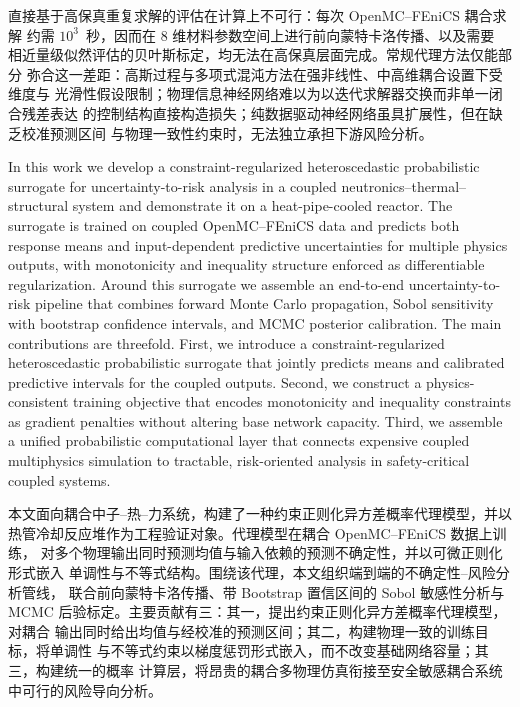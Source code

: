 \documentclass[11pt,a4paper]{article}
\begin{document}
直接基于高保真重复求解的评估在计算上不可行：每次 OpenMC--FEniCS 耦合求解
约需 $10^{3}$~秒，因而在 8 维材料参数空间上进行前向蒙特卡洛传播、以及需要
相近量级似然评估的贝叶斯标定，均无法在高保真层面完成。常规代理方法仅能部分
弥合这一差距：高斯过程与多项式混沌方法在强非线性、中高维耦合设置下受维度与
光滑性假设限制；物理信息神经网络难以为以迭代求解器交换而非单一闭合残差表达
的控制结构直接构造损失；纯数据驱动神经网络虽具扩展性，但在缺乏校准预测区间
与物理一致性约束时，无法独立承担下游风险分析。

In this work we develop a constraint-regularized heteroscedastic probabilistic
surrogate for uncertainty-to-risk analysis in a coupled
neutronics--thermal--structural system and demonstrate it on a
heat-pipe-cooled reactor. The surrogate is trained on coupled OpenMC--FEniCS
data and predicts both response means and input-dependent predictive
uncertainties for multiple physics outputs, with monotonicity and inequality
structure enforced as differentiable regularization. Around this surrogate we
assemble an end-to-end uncertainty-to-risk pipeline that combines forward
Monte Carlo propagation, Sobol sensitivity with bootstrap confidence intervals,
and MCMC posterior calibration. The main contributions are threefold. First,
we introduce a constraint-regularized heteroscedastic probabilistic surrogate
that jointly predicts means and calibrated predictive intervals for the
coupled outputs. Second, we construct a physics-consistent training objective
that encodes monotonicity and inequality constraints as gradient penalties
without altering base network capacity. Third, we assemble a unified
probabilistic computational layer that connects expensive coupled multiphysics
simulation to tractable, risk-oriented analysis in safety-critical coupled
systems.

本文面向耦合中子--热--力系统，构建了一种约束正则化异方差概率代理模型，并以
热管冷却反应堆作为工程验证对象。代理模型在耦合 OpenMC--FEniCS 数据上训练，
对多个物理输出同时预测均值与输入依赖的预测不确定性，并以可微正则化形式嵌入
单调性与不等式结构。围绕该代理，本文组织端到端的不确定性--风险分析管线，
联合前向蒙特卡洛传播、带 Bootstrap 置信区间的 Sobol 敏感性分析与 MCMC
后验标定。主要贡献有三：其一，提出约束正则化异方差概率代理模型，对耦合
输出同时给出均值与经校准的预测区间；其二，构建物理一致的训练目标，将单调性
与不等式约束以梯度惩罚形式嵌入，而不改变基础网络容量；其三，构建统一的概率
计算层，将昂贵的耦合多物理仿真衔接至安全敏感耦合系统中可行的风险导向分析。
\end{document}
